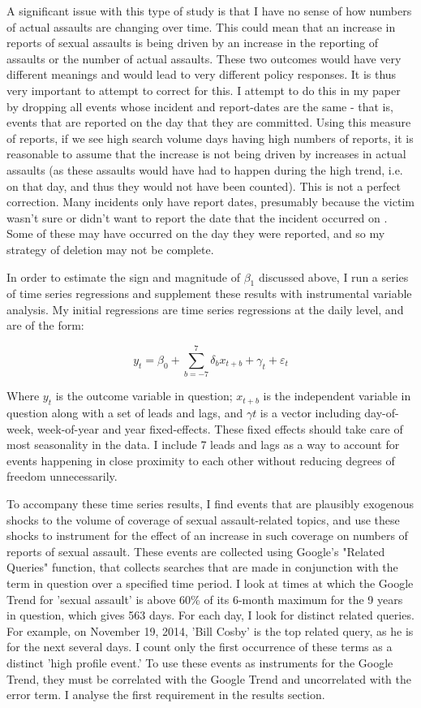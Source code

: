 \documentclass[AER,draftmode]{AEA}
\begin{document}
A significant issue with this type of study is that I have no sense of how numbers of actual assaults are changing over time. This could mean that an increase in reports of sexual assaults is being driven by an increase in the reporting of assaults or the number of actual assaults. These two outcomes would have very different meanings and would lead to very different policy responses. It is thus very important to attempt to correct for this. I attempt to do this in my paper by dropping all events whose incident and report-dates are the same - that is, events that are reported on the day that they are committed. Using this measure of reports, if we see high search volume days having high numbers of reports, it is reasonable to assume that the increase is not being driven by increases in actual assaults (as these assaults would have had to happen during the high trend, i.e. on that day, and thus they would not have been counted). This is not a perfect correction. Many incidents only have report dates, presumably because the victim wasn't sure or didn't want to report the date that the incident occurred on . Some of these may have occurred on the day they were reported, and so my strategy of deletion may not be complete.

In order to estimate the sign and magnitude of $\beta_1$ discussed above, I run a series of time series regressions and supplement these results with instrumental variable analysis. My initial regressions are time series regressions at the daily level, and are of the form: 

$$ 
y_{t} = \beta_{0} + \sum_{b=-7}^{7} \delta_{b} x_{t+b} + \gamma_{t} + \varepsilon_{t}
$$

Where $y_{t}$ is the outcome variable in question; $x_{t+b}$ is the independent variable in question along with a set of leads and lags, and $\gamma{t}$ is a vector including day-of-week, week-of-year and year fixed-effects. These fixed effects should take care of most seasonality in the data. I include 7 leads and lags as a way to account for events happening in close proximity to each other without reducing degrees of freedom unnecessarily.

To accompany these time series results, I find events that are plausibly exogenous shocks to the volume of coverage of sexual assault-related topics, and use these shocks to instrument for the effect of an increase in such coverage on numbers of reports of sexual assault. These events are collected using Google's "Related Queries" function, that collects searches that are made in conjunction with the term in question over a specified time period. I look at times at which the Google Trend for 'sexual assault' is above 60\% of its 6-month maximum for the 9 years in question, which gives 563 days. For each day, I look for distinct related queries. For example, on November 19, 2014, 'Bill Cosby' is the top related query, as he is for the next several days. I count only the first occurrence of these terms as a distinct 'high profile event.' To use these events as instruments for the Google Trend, they must be correlated with the Google Trend and uncorrelated with the error term. I analyse the first requirement in the results section. 
\end{document}
